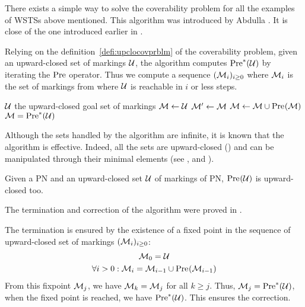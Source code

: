 There exists a simple way to solve the coverability problem for all the examples of \acp{WSTS} above mentioned.
This algorithm was introduced by Abdulla  \citep{Abdulla96}.
It is close of the one introduced earlier in \cite{Finkel90}.

Relying on the definition~\ref{defi:upclocovprblm} of the coverability problem, given an upward-closed set of markings $\mathcal{U}$, the algorithm computes $\operatorname{Pre}^*_{}(\mathcal{U})$ by iterating the $\operatorname{Pre}$ operator.
Thus we compute a sequence $(\mathcal{M}_i)_{i \geq 0}$ where $\mathcal{M}_i$ is the set of markings from where $\mathcal{U}$ is reachable in $i$ or less steps.


\begin{algorithm}
  \caption{$\back$}
  \label{algo:back}

  \begin{algorithmic}
    \Require $\mathcal{U}$ the upward-closed goal set of markings
    \State $\mathcal{M} \gets \mathcal{U}$
    \Repeat
      \State $\mathcal{M}'\gets \mathcal{M}$
      \State $\mathcal{M} \gets \mathcal{M} \cup \operatorname{Pre}_{}(\mathcal{M})$
    \Ensure $\mathcal{M} = \operatorname{Pre}^*_{}(\mathcal{U})$
  \end{algorithmic}
\end{algorithm}


Although the sets handled by the algorithm are infinite, it is known that the algorithm is effective.
Indeed, all the sets are upward-closed () and can be manipulated through their minimal elements (see , and \cite{Ganty09, valk1985residue}).

\begin{lemm}
  \label{theo:pre-upc}
  Given a \ac{PN} and an upward-closed set $\mathcal{U}$ of markings of \ac{PN}, $\operatorname{Pre}_{}(\mathcal{U})$ is upward-closed too.
\end{lemm}

The termination and correction of the algorithm were proved in \cite{Abdulla96}.%


The termination is ensured by the existence of a fixed point in the sequence of upward-closed set of markings $(\mathcal{M}_i)_{i \geq 0}$:
\begin{gather*}
  \mathcal{M}_0 = \mathcal{U} \\
  \forall i > 0 : \mathcal{M}_i = \mathcal{M}_{i-1} \cup \operatorname{Pre}_{}(\mathcal{M}_{i-1})
\end{gather*}
From this fixpoint $\mathcal{M}_j$, we have $\mathcal{M}_k = \mathcal{M}_j$ for all $k \geq j$.
Thus, $\mathcal{M}_j = \operatorname{Pre}^*_{}(\mathcal{U})$, \ie when the fixed point is reached, we have $\operatorname{Pre}^*_{}(\mathcal{U})$.
This ensures the correction.

